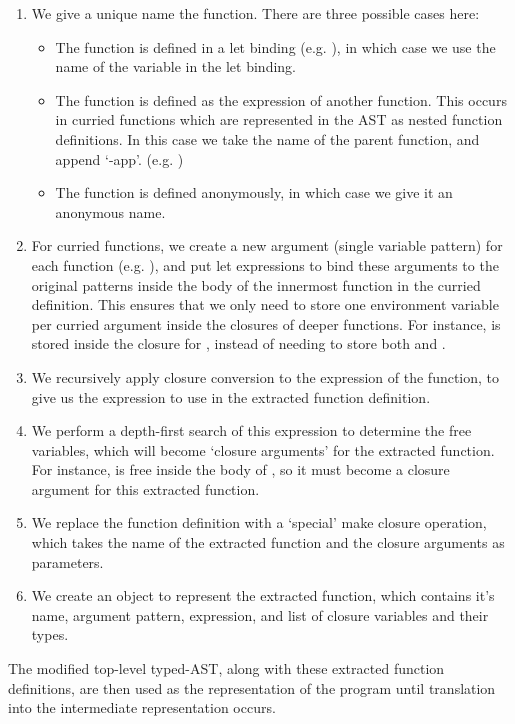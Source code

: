 \begin{enumerate}
\item We give a unique name the function. There are three possible cases here:
\begin{itemize}
\item The function is defined in a let binding (e.g. ), in which case we use the name of the variable in the let binding.
\item The function is defined as the expression of another function. This occurs in curried functions which are represented in the AST as nested function definitions. In this case we take the name of the parent function, and append `-app'. (e.g. )
\item The function is defined anonymously, in which case we give it an anonymous name.
\end{itemize}
\item For curried functions, we create a new argument (single variable pattern) for each function (e.g. ), and put let expressions to bind these arguments to the original patterns inside the body of the innermost function in the curried definition. This ensures that we only need to store one environment variable per curried argument inside the closures of deeper functions. For instance,  is stored inside the closure for , instead of needing to store both  and .

\item We recursively apply closure conversion to the expression of the function, to give us the expression to use in the extracted function definition.
\item We perform a depth-first search of this expression to determine the free variables, which will become `closure arguments' for the extracted function. For instance,  is free inside the body of , so it must become a closure argument for this extracted function.
\item We replace the function definition with a `special' make closure operation, which takes the name of the extracted function and the closure arguments as parameters. 
\item We create an object to represent the extracted function, which contains it's name, argument pattern, expression, and list of closure variables and their types.
\end{enumerate}
The modified top-level typed-AST, along with these extracted function definitions, are then used as the representation of the program until translation into the intermediate representation occurs.





